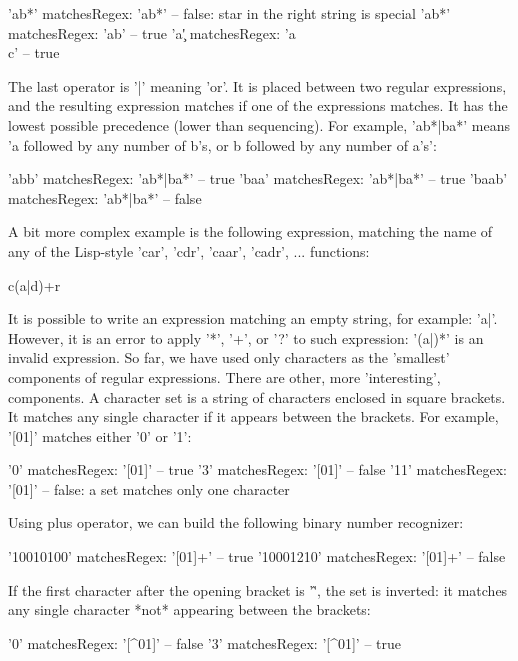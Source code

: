\documentclass[a4paper,10pt,twoside]{book}
\begin{document}
\begin{code}{} 	'ab*' matchesRegex: 'ab*'		 	-- false: star in the right string is special 	'ab*' matchesRegex: 'ab\*'	 		-- true 	'a\c' matchesRegex: 'a\\c'		 	-- true
\end{code} The last operator is '|' meaning 'or'. It is placed between two regular expressions, and the resulting expression matches if one of the expressions matches. It has the lowest possible precedence (lower than sequencing). For example, 'ab*|ba*' means 'a followed by any number of b's, or b followed by any number of a's':
\begin{code}{} 	'abb' matchesRegex: 'ab*|ba*'	 	-- true 	'baa' matchesRegex: 'ab*|ba*'	 	-- true 	'baab' matchesRegex: 'ab*|ba*'	 	-- false
\end{code} A bit more complex example is the following expression, matching the name of any of the Lisp-style 'car', 'cdr', 'caar', 'cadr', ... functions: 
\begin{code}{}
	c(a|d)+r
\end{code} It is possible to write an expression matching an empty string, for example: 'a|'.  However, it is an error to apply '*', '+', or '?' to such expression: '(a|)*' is an invalid expression. So far, we have used only characters as the 'smallest' components of regular expressions. There are other, more 'interesting', components. A character set is a string of characters enclosed in square brackets. It matches any single character if it appears between the brackets. For example, '[01]' matches either '0' or '1': 

\begin{code}{}
	'0' matchesRegex: '[01]'		 		-- true 	'3' matchesRegex: '[01]'		 		-- false 	'11' matchesRegex: '[01]'		 		-- false: a set matches only one character
\end{code}	
	 Using plus operator, we can build the following binary number recognizer:

\begin{code}{} 	'10010100' matchesRegex: '[01]+'	 	-- true 	'10001210' matchesRegex: '[01]+'	 	-- false
\end{code}
 If the first character after the opening bracket is '\^', the set is inverted: it matches any single character *not* appearing between the brackets:

\begin{code}{} 	'0' matchesRegex: '[^01]'		  		-- false 	'3' matchesRegex: '[^01]'		 		-- true
\end{code}
\end{document}
